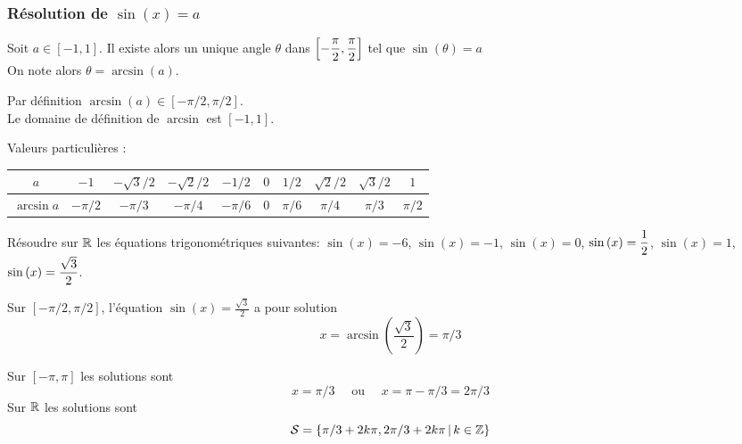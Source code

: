 \documentclass[a4paper, 11pt]{article}
\begin{document}
\subsubsection{R\'esolution de $\sin{(x)}=a$}

\noindent 


\begin{prop}
Soit $a \in [-1,1]$. Il existe alors un unique angle $\theta$ dans $\left[ -\displaystyle \frac{\pi}{2}, \frac{\pi}{2} \right]$ tel que $\sin(\theta) =a$\\
On note alors $\theta=\arcsin(a)$.
\end{prop}
\warning Par définition $\arcsin(a) \in [-\pi/2, \pi/2]$.\\
\warning Le domaine de définition de $\arcsin$ est $[-1,1]$. 

\vspace{0.5cm}
Valeurs particuli\`eres :\\

\noindent \begin{tabular}{|c|c|c|c|c|c|c|c|c|c|}
\hline
\rule[-3mm]{0pt}{8mm}  $a$& $ -1$ & $-\sqrt{3}/2$ & $-\sqrt{2}/2$ & $-1/2$   &  $0$  & $1/2$ & $\sqrt{2}/2$&  $\sqrt{3}/2$&  $1$ \\ 
\hline
\rule[-3mm]{0pt}{8mm}  $\arcsin{a}$ & $-\pi/2$ &$-\pi/3$& $-\pi/4$  &$-\pi/6$   &$0$  &$\pi/6$&$\pi/4$&$\pi/3$&$\pi/2$ \\
\hline
\end{tabular}

\qquad


{\footnotesize
\begin{exo} R\'esoudre sur $\mathbb{R}$  les \'equations trigonom\'etriques suivantes: $\sin{(x)}=-6$, $\sin{(x)}=-1$, $\sin{(x)}=0$, $\displaystyle \sin{(x)}=\frac{1}{2}$, $\sin{(x)}=1$, $\displaystyle \sin{(x)}=\frac{\sqrt{3}}{2}$. 
\end{exo}}
\vspace{0.3cm}
Sur $[-\pi/2,\pi/2]$, l'équation $\sin{(x)}=\frac{\sqrt{3}}{2}$ a pour solution 
$$x= \arcsin(\frac{\sqrt{3}}{2})= \pi/3$$

Sur $[-\pi, \pi]$ les solutions sont 
$$x =\pi/3 \quad \text{ ou } \quad x= \pi-\pi/3 = 2\pi/3$$
Sur $\mathbb{R}$ les solutions sont 
$$\mathcal{S}  =\{ \pi/3 +2k\pi , 2\pi/3 +2k\pi \, |\, k\in \mathbb{Z}\}$$
\end{document}
